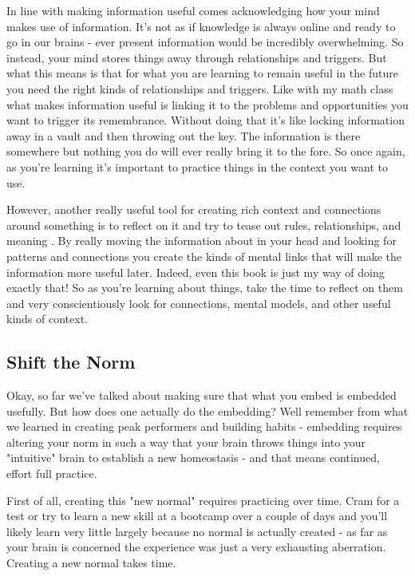 \documentclass[11pt]{book}
\begin{document}
In line with making information useful comes acknowledging how your mind makes use of information. It's not as if knowledge is always online and ready to go in our brains - ever present information would be incredibly overwhelming. So instead, your mind stores things away through relationships and triggers. But what this means is that for what you are learning to remain useful in the future you need the right kinds of relationships and triggers. Like with my math class what makes information useful is linking it to the problems and opportunities you want to trigger its remembrance. Without doing that it's like locking information away in a vault and then throwing out the key. The information is there somewhere but nothing you do will ever really bring it to the fore. So once again, as you're learning it's important to practice things in the context you want to use. 
\newline

However, another really useful tool for creating rich context and connections around something is to reflect on it and try to tease out rules, relationships, and meaning \cite{stick}. By really moving the information about in your head and looking for patterns and connections you create the kinds of mental links that will make the information more useful later. Indeed, even this book is just my way of doing exactly that! So as you're learning about things, take the time to reflect on them and very conscientiously look for connections, mental models, and other useful kinds of context. 
\newline

\subsection{Shift the Norm}
Okay, so far we've talked about making sure that what you embed is embedded usefully. But how does one actually do the embedding? Well remember from what we learned in creating peak performers and building habits - embedding requires altering your norm in such a way that your brain throws things into your "intuitive" brain to establish a new homeostasis \cite{duhigg} \cite{ericsson} - and that means continued, effort full practice. 
\newline

First of all, creating this "new normal" requires practicing over time. Cram for a test or try to learn a new skill at a bootcamp over a couple of days and you'll likely learn very little \cite{stick} largely because no normal is actually created - as far as your brain is concerned the experience was just a very exhausting aberration. Creating a new normal takes time.
\newline
\end{document}
